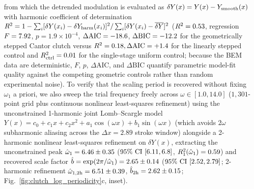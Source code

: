 \documentclass[pdflatex,sn-nature]{sn-jnl}
\DeclareRobustCommand{\roundone}[1]{\fpeval{round(#1,1)}}
\DeclareRobustCommand{\roundtwo}[1]{\fpeval{round(#1,2)}}
\begin{document}
from which the detrended modulation is evaluated as $\delta Y(x) = Y(x) - Y_{\rm smooth}(x)$ with harmonic coefficient of determination $R^2 = 1 - \sum_i [\delta Y(x_i) - \delta Y_{\rm harm}(x_i)]^2 / \sum_i [\delta Y(x_i) - \overline{\delta Y}]^2$ ($R^2 = \roundtwo{\LogperSteppedRzRtwo}$, regression $F = \roundtwo{\LogperSteppedRzFstatCantor}$, $p = 1.9 \times 10^{-4}$, $\Delta\mathrm{AIC} = \roundone{\LogperSteppedRzDeltaAicCantor}$, $\Delta\mathrm{BIC} = \roundone{\LogperSteppedRzDeltaBicCantor}$ for the geometrically stepped Cantor clutch versus $R^2 = \roundtwo{\LogperSteppedRzRtwoLinear}, \Delta\mathrm{AIC} = +\roundone{\LogperSteppedRzDeltaAicLinear}$ for the linearly stepped control and $R^2_{\rm ctrl} = \roundtwo{\LogperSteppedRzRtwoUniform}$ for the single-stage uniform control; because the BEM data are deterministic, $F$, $p$, $\Delta\mathrm{AIC}$, and $\Delta\mathrm{BIC}$ quantify parametric model-fit quality against the competing geometric controls rather than random experimental noise). To verify that the scaling period is recovered without fixing $\omega_1$ a priori, we also sweep the trial frequency freely across $\omega \in [1.0, 14.0]$ ($1{,}301$-point grid plus continuous nonlinear least-squares refinement) using the unconstrained 1-harmonic joint Lomb--Scargle model $Y(x) = c_0 + c_1 x + c_2 x^2 + a_1 \cos(\omega x) + b_1 \sin(\omega x)$ (which avoids $2\omega$ subharmonic aliasing across the $\Delta x = 2.89$ stroke window) alongside a 2-harmonic nonlinear least-squares refinement on $\delta Y(x)$, extracting the unconstrained peak $\hat{\omega}_1 = \roundtwo{\LogperFreeOmegaoneCantor} \pm \roundtwo{\LogperFreeOmegaoneCininefiveHalfCantor}$ ($95\%\text{ CI } [\roundtwo{\LogperFreeOmegaoneCininefiveLowCantor}, \roundtwo{\LogperFreeOmegaoneCininefiveHighCantor}]$, $R^2_1(\hat{\omega}_1) = \roundtwo{\LogperFreeRtwoPeakCantor}$) and recovered scale factor $\hat{b} = \exp(2\pi/\hat{\omega}_1) = \roundtwo{\LogperFreeBHatCantor} \pm \roundtwo{\LogperFreeBHatCininefiveHalfCantor}$ ($95\%\text{ CI } [\roundtwo{\LogperFreeBHatCininefiveLowCantor}, \roundtwo{\LogperFreeBHatCininefiveHighCantor}]$; 2-harmonic refinement $\hat{\omega}_{1,\rm 2h} = \roundtwo{\LogperFreeOmegaoneTwohCantor} \pm \roundtwo{\LogperFreeOmegaoneTwohCininefiveHalfCantor}$, $\hat{b}_{\rm 2h} = \roundtwo{\LogperFreeBHatTwohCantor} \pm \roundtwo{\LogperFreeBHatTwohCininefiveHalfCantor}$; Fig.~\ref{fig:clutch_log_periodicity}c, inset).
\end{document}
